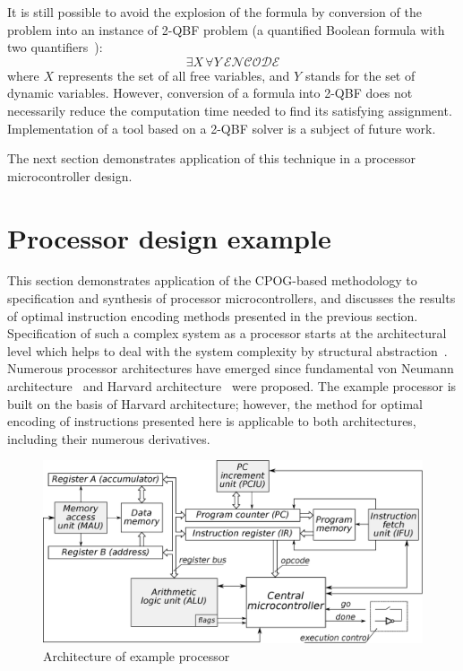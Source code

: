 It is still possible to avoid the explosion of the formula by conversion
of the problem into an instance of 2-QBF problem (a quantified Boolean
formula with two quantifiers~\cite{2004_ranjan_qbf}):
\[
\exists X\,\forall Y\ \mathcal{ENCODE}
\]
where $X$ represents the set of all free variables, and $Y$ stands
for the set of dynamic variables. However, conversion of a formula
into 2-QBF does not necessarily reduce the computation time needed
to find its satisfying assignment. Implementation of a tool based
on a 2-QBF solver is a subject of future work.

The next section demonstrates application of this technique in a processor
microcontroller design.


\section{Processor design example\label{sec-processor}
}

This section demonstrates application of the CPOG-based methodology
to specification and synthesis of processor microcontrollers, and
discusses the results of optimal instruction encoding methods presented
in the previous section. Specification of such a complex system as
a processor starts at the architectural level which helps to deal
with the system complexity by structural abstraction~\cite{1994_de_micheli_book}.
Numerous processor architectures have emerged since fundamental von
Neumann architecture\emph{~}\cite{1946_burks_architecture} and Harvard
architecture\emph{~}\cite{1946_aiken_calculator} were proposed.
The example processor is built on the basis of Harvard architecture;
however, the method for optimal encoding of instructions presented
here is applicable to both architectures, including their
numerous derivatives.

\begin{figure}
\begin{centering}
\includegraphics[width=0.75\columnwidth]{fig/processor_architecture}

\par\end{centering}

\caption{Architecture of example processor\label{app-fig-Architecture-of-example}}
\end{figure}



